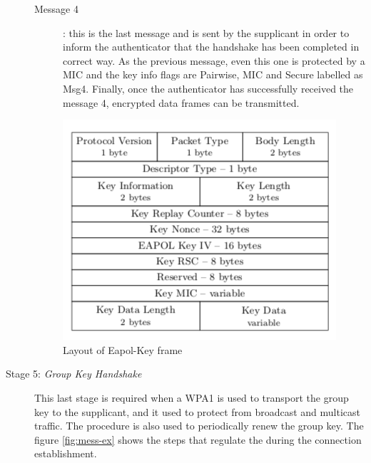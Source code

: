 \begin{description}
\begin{description}
  \item[Message 4]: this is the last message and is sent by the supplicant in order to inform the authenticator that the handshake has been completed in correct way. As the previous message, even this one is protected
  by a MIC and the key info flags are Pairwise, MIC and Secure labelled as Msg4. Finally, once the authenticator has successfully received the message 4, encrypted data frames can be transmitted.
\end{description}

\begin{figure}[tbh]
  \centering
  \includegraphics[width=0.8\linewidth]{images/eapol-frame.png}
  \caption[Layout of Eapol-Key frame]{Layout of Eapol-Key frame}
  \label{fig:eapol-frame}
\end{figure}


\item[Stage 5: \textit{Group Key Handshake}]

This last stage is required when a WPA1 is used to transport the group key to the supplicant, and it used to protect from broadcast and multicast traffic. 
The procedure is also used  to periodically renew the group key. The figure \ref{fig:mess-ex} shows the steps that regulate the \fwh during the connection establishment.\cite{asc}


\end{description}
